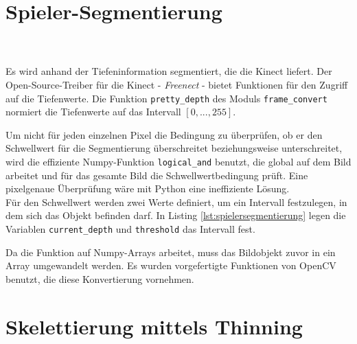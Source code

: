 \section{Spieler-Segmentierung}
\\\\
Es wird anhand der Tiefeninformation segmentiert, die die Kinect liefert. Der Open-Source-Treiber für die Kinect - \emph{Freenect} - bietet Funktionen für den Zugriff auf die
Tiefenwerte. Die Funktion \texttt{pretty\_depth} des Moduls
\texttt{frame\_convert} normiert die Tiefenwerte auf das 
Intervall $[0,...,255]$. 

Um nicht für jeden einzelnen Pixel die Bedingung zu überprüfen, ob er den Schwellwert für die Segmentierung überschreitet beziehungsweise unterschreitet, wird die effiziente Numpy-Funktion \texttt{logical\_and} benutzt, die global auf dem Bild arbeitet und für das gesamte Bild die Schwellwertbedingung prüft. Eine pixelgenaue Überprüfung wäre mit Python eine ineffiziente Lösung.\\ Für den Schwellwert werden zwei 
Werte definiert, um ein Intervall festzulegen, in dem sich das Objekt befinden darf. In Listing \ref{lst:spielersegmentierung} legen die Variablen \texttt{current\_depth} und \texttt{threshold} das Intervall fest. 

Da die Funktion auf Numpy-Arrays arbeitet, muss das Bildobjekt zuvor in ein Array umgewandelt werden. 
Es wurden vorgefertigte Funktionen von OpenCV benutzt, die diese Konvertierung vornehmen. 
\section{Skelettierung mittels Thinning} 
\label{implThinning}

